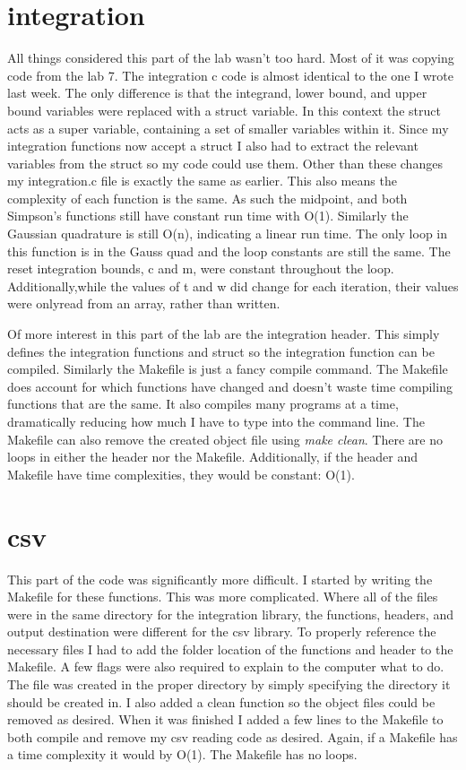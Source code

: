 \documentclass{article}
\begin{document}
\section{integration}
All things considered this part of the lab wasn't too hard. Most of it was copying code from the lab 7. The integration c code is almost identical to the one I wrote last week. The only difference is that the integrand, lower bound, and upper bound variables were replaced with a struct variable. In this context the struct acts as a super variable, containing a set of smaller variables within it. Since my integration functions now accept a struct I also had to extract the relevant variables from the struct so my code could use them. Other than these changes my integration.c file is exactly the same as earlier. This also means the complexity of each function is the same. As such the midpoint, and both Simpson's functions still have constant run time with O(1). Similarly the Gaussian quadrature is still O(n), indicating a linear run time. The only loop in this function is in the Gauss quad and the loop constants are still the same. The reset integration bounds, c and m, were constant throughout the loop. Additionally,while the values of t and w did change for each iteration, their values were onlyread from an array, rather than written. 

Of more interest in this part of the lab are the integration header. This simply defines the integration functions and struct so the integration function can be compiled. Similarly the Makefile is just a fancy compile command. The Makefile does account for which functions have changed and doesn't waste time compiling functions that are the same. It also compiles many programs at a time, dramatically reducing how much I have to type into the command line. The Makefile can also remove the created object file using \textit{make clean}. There are no loops in either the header nor the Makefile. Additionally, if the header and Makefile have time complexities, they would be constant: O(1).

\section{csv}
This part of the code was significantly more difficult. I started by writing the Makefile for these functions. This was more complicated. Where all of the files were in the same directory for the integration library, the functions, headers, and output destination were different for the csv library. To properly reference the necessary files I had to add the folder location of the functions and header to the Makefile. A few flags were also required to explain to the computer what to do. The file was created in the proper directory by simply specifying the directory it should be created in. I also added a clean function so the object files could be removed as desired. When it was finished I added a few lines to the Makefile to both compile and remove my csv reading code as desired. Again, if a Makefile has a time complexity it would by O(1). The Makefile has no loops.
\end{document}
